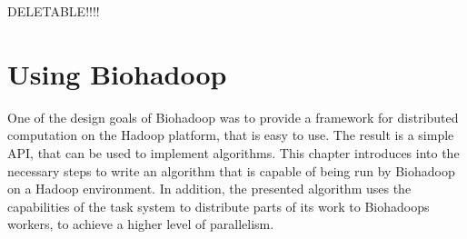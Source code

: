 DELETABLE!!!!

\chapter{Using Biohadoop}
\label{chap:usage}
One of the design goals of Biohadoop was to provide a framework for distributed computation on the Hadoop platform, that is easy to use. The result is a simple API, that can be used to implement algorithms. This chapter introduces into the necessary steps to write an algorithm that is capable of being run by Biohadoop on a Hadoop environment. In addition, the presented algorithm uses the capabilities of the task system to distribute parts of its work to Biohadoops workers, to achieve a higher level of parallelism.

% 
% 
